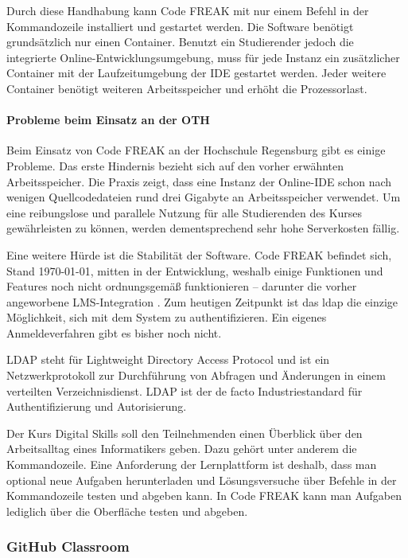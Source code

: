 Durch diese Handhabung kann Code FREAK mit nur einem Befehl in der
Kommandozeile installiert und gestartet werden. Die Software benötigt
grundsätzlich nur einen Container. Benutzt ein Studierender jedoch die
integrierte Online-Entwicklungsumgebung, muss für jede Instanz ein zusätzlicher
Container mit der Laufzeitumgebung der IDE gestartet werden. Jeder weitere
Container benötigt weiteren Arbeitsspeicher und erhöht die Prozessorlast.

\paragraph{Probleme beim Einsatz an der OTH}
Beim Einsatz von Code FREAK an der Hochschule Regensburg gibt es einige
Probleme. Das erste Hindernis bezieht sich auf den vorher erwähnten
Arbeitsspeicher. Die Praxis zeigt, dass eine Instanz der Online-IDE schon nach
wenigen Quellcodedateien rund drei Gigabyte an Arbeitsspeicher verwendet. Um
eine reibungslose und parallele Nutzung für alle Studierenden des Kurses
gewährleisten zu können, werden dementsprechend sehr hohe Serverkosten fällig. 
\parencite{codefreak-memory-problem}

Eine weitere Hürde ist die Stabilität der Software. Code FREAK befindet sich,
Stand \today, mitten in der Entwicklung, weshalb einige Funktionen und Features
noch nicht ordnungsgemäß funktionieren -- darunter die vorher angeworbene
LMS-Integration \parencite{codefreak-docs}. Zum heutigen Zeitpunkt ist das
\ac{ldap} die einzige Möglichkeit, sich mit dem System zu authentifizieren. Ein
eigenes Anmeldeverfahren gibt es bisher noch nicht.

LDAP steht für Lightweight Directory Access Protocol und ist ein
Netzwerkprotokoll zur Durchführung von Abfragen und Änderungen in einem 
verteilten Verzeichnisdienst. LDAP ist der de facto Industriestandard für
Authentifizierung und Autorisierung. \parencite{ldap}

Der Kurs Digital Skills soll den Teilnehmenden einen Überblick über den
Arbeitsalltag eines Informatikers geben. Dazu gehört unter anderem die
Kommandozeile. Eine Anforderung der Lernplattform ist deshalb, dass man
optional neue Aufgaben herunterladen und Lösungsversuche über Befehle in der
Kommandozeile testen und abgeben kann. In Code FREAK kann man Aufgaben lediglich
über die Oberfläche testen und abgeben.

\newpage
\subsubsection{GitHub Classroom}
